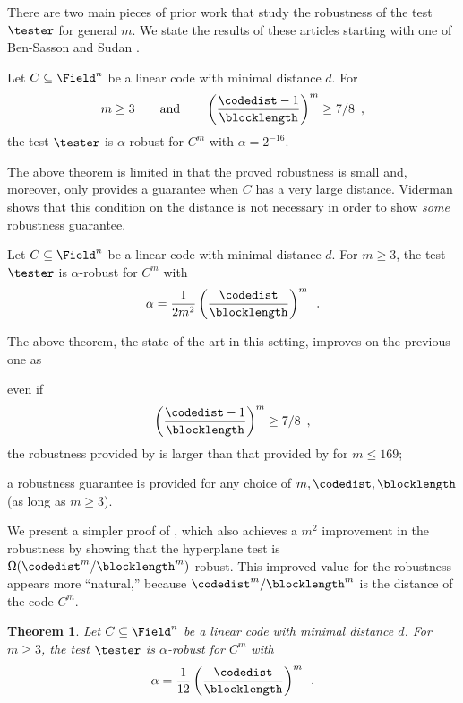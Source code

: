 \documentclass{toc}
\theoremstyle{plain}
\newtheorem{ftheorem}[theorem]{Theorem}
\begin{document}
There are two main
%
pieces of prior work  %
that study the robustness of the test $\tester$ for general $m$.
We state the results of these
%
articles  %
starting with one of Ben-Sasson and Sudan \cite{Ben-SassonS06}.

\begin{theorem}
\label{thm:bs}
Let $C \subseteq \Field^n$ be a linear code with minimal distance $d$.
For
\[
  m \geq 3\qquad\text{and}\qquad \left(\frac{\codedist-1}{\blocklength}\right)^m \geq 7/8\enspace,
\]
the test $\tester$ is $\alpha$-robust for $C^m$ with $\alpha = 2^{-16}$.
\end{theorem}

\noindent
The above theorem is limited in that the proved robustness is small and, moreover, only provides a guarantee when $C$ has a very large distance. Viderman \cite{Viderman12} shows that this condition on the distance is not necessary in order to show \emph{some} robustness guarantee.

\begin{theorem}
\label{thm:vid}
Let $C \subseteq \Field^n$ be a linear code with minimal distance $d$.
For $m \geq 3$, the test $\tester$ is $\alpha$-robust %
for   %
$C^m$ with
\[
  \alpha = \frac{1}{2 m^2} \left(\frac{\codedist}{\blocklength}\right)^m\enspace.
\]
\end{theorem}

\noindent
The above theorem, the state of the art in this setting, improves on the previous one as
\begin{inparaenum}[(i)]
\item even if
  \[
    \left(\frac{\codedist-1}{\blocklength}\right)^{m} \geq 7/8\enspace,
  \]
  the robustness provided by  is larger than
  that provided by  for $m \leq 169$;
  \item a robustness guarantee is provided for any choice of $m,\codedist,\blocklength$ (as long as $m \geq 3$).
\end{inparaenum}

We present a simpler proof of , which also achieves a $m^2$ improvement in the robustness by showing that the hyperplane test is $\Omega({\codedist^m}/{\blocklength^m})$-robust. This improved value for the robustness appears more ``natural,'' because ${\codedist^m}/{\blocklength^m}$ is the distance of the code $C^m$.

\begin{ftheorem}
\label{thm:pat-robustness}
Let $C \subseteq \Field^n$ be a linear code with minimal distance $d$.
For $m \geq 3$, the test $\tester$ is $\alpha$-robust for $C^m$ with
\[
  \alpha = \frac{1}{12} \left(\frac{\codedist}{\blocklength}\right)^m\enspace.
\]
\end{ftheorem}
\end{document}
